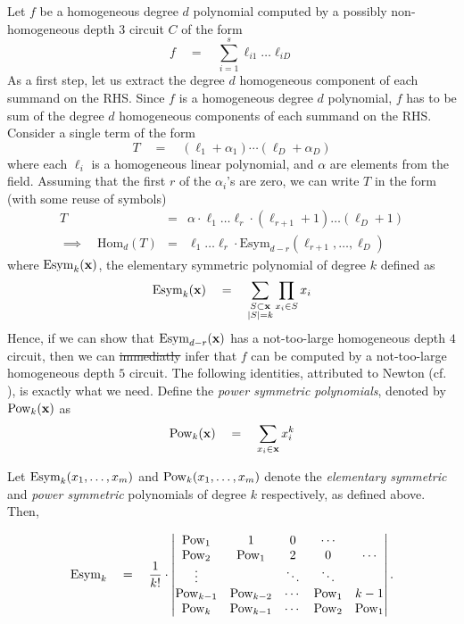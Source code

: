 \documentclass{beatcs}
\newcommand{\spaced}[1]{\quad#1\quad}
\providecommand{\DIFaddtex}[1]{{\protect\color{blue}\uwave{#1}}} %
\providecommand{\DIFdeltex}[1]{{\protect\color{red}\sout{#1}}}                      %
\providecommand{\DIFaddbegin}{} %
\providecommand{\DIFaddend}{} %
\providecommand{\DIFdelbegin}{} %
\providecommand{\DIFdelend}{} %
\providecommand{\DIFadd}[1]{\texorpdfstring{\DIFaddtex{#1}}{#1}} %
\providecommand{\DIFdel}[1]{\texorpdfstring{\DIFdeltex{#1}}{}} %
\begin{document}
Let $f$ be a homogeneous degree $d$ polynomial computed by a possibly non-homogeneous depth $3$ circuit $C$ of the form
\[
f\quad=\quad \sum_{i=1}^s \ell_{i1}\dots \ell_{iD}
\]
As a first step, let us extract the degree $d$ homogeneous component of each summand on the RHS. Since $f$ is a homogeneous degree $d$ polynomial, $f$ has to be sum of the degree $d$ homogeneous components of each summand on the RHS. Consider a single term of the form
\[
T \spaced{=} (\ell_1 + \alpha_1)\cdots (\ell_D + \alpha_D)
\]
where each $\ell_i$ is a homogeneous linear polynomial, and $\alpha$ are elements from the field. Assuming that the first $r$ of the $\alpha_i$'s are zero, we can write $T$ in the form (with some reuse of symbols)
\begin{eqnarray*}
T & = &  \alpha \cdot \ell_1\dots \ell_r \cdot (\ell_{r+1} + 1)\dots (\ell_D+1)\\
\implies \quad \mathrm{Hom}_d(T) & = & \ell_1 \dots \ell_r \cdot \mathrm{Esym}_{d-r}(\ell_{r+1}, \dots, \ell_D)
\end{eqnarray*}
where $\mathrm{Esym}_{k}(\mathbf{x})$, the elementary symmetric polynomial of degree $k$ defined as
\[
\mathrm{Esym}_k(\vecx) \spaced{=} \sum_{\substack{S\subset \vecx\\|S| = k}} \prod_{x_i\in S}x_i
\]
Hence, if we can show that $\mathrm{Esym}_{d-r}(\mathbf{x})$ has a not-too-large homogeneous depth $4$ circuit, then we can \DIFdelbegin \DIFdel{immediatly }\DIFdelend \DIFaddbegin \DIFadd{immediately }\DIFaddend infer that $f$ can be computed by a not-too-large homogeneous depth $5$ circuit. The following identities, attributed to Newton (cf. \cite{lit50}), is exactly what we need. Define the \emph{power symmetric polynomials}, denoted by $\mathrm{Pow}_k(\mathbf{x})$ as
\[
\mathrm{Pow}_k(\mathbf{x}) \quad = \quad \sum_{x_i \in \mathbf{x}} x_i^k
\]

\begin{lemma}\label{lem:newton-identities}
  Let $\mathrm{Esym}_k(x_1,\ldots,x_m)$ and $\mathrm{Pow}_k(x_1,\ldots,x_m)$ denote
  the \emph{elementary symmetric} and \emph{power symmetric} polynomials of degree
  $k$ respectively, as defined above. Then,

  $$
  \ESym_k\spaced{=}\frac{1}{k!} \cdot \begin{vmatrix}\PSym_1 & 1 & 0 & \cdots\\ \PSym_2
    & \PSym_1 & 2 & 0 & \cdots \\ \vdots&& \ddots & \ddots \\
    \PSym_{k-1} & \PSym_{k-2} & \cdots & \PSym_1 & k-1 \\ \PSym_k &
    \PSym_{k-1} & \cdots & \PSym_2 & \PSym_1 \end{vmatrix}.
  $$
\end{lemma}
\end{document}
